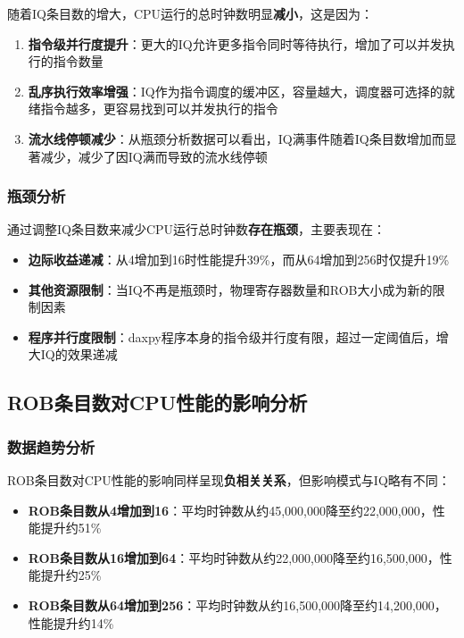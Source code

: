 \documentclass[a4paper]{article}
\begin{document}
随着IQ条目数的增大，CPU运行的总时钟数明显\textbf{减小}，这是因为：

\begin{enumerate}
    \item \textbf{指令级并行度提升}：更大的IQ允许更多指令同时等待执行，增加了可以并发执行的指令数量
    \item \textbf{乱序执行效率增强}：IQ作为指令调度的缓冲区，容量越大，调度器可选择的就绪指令越多，更容易找到可以并发执行的指令
    \item \textbf{流水线停顿减少}：从瓶颈分析数据可以看出，IQ满事件随着IQ条目数增加而显著减少，减少了因IQ满而导致的流水线停顿
\end{enumerate}

\subsubsection{瓶颈分析}

通过调整IQ条目数来减少CPU运行总时钟数\textbf{存在瓶颈}，主要表现在：

\begin{itemize}
    \item \textbf{边际收益递减}：从4增加到16时性能提升39\%，而从64增加到256时仅提升19\%
    \item \textbf{其他资源限制}：当IQ不再是瓶颈时，物理寄存器数量和ROB大小成为新的限制因素
    \item \textbf{程序并行度限制}：daxpy程序本身的指令级并行度有限，超过一定阈值后，增大IQ的效果递减
\end{itemize}

\subsection{ROB条目数对CPU性能的影响分析}

\subsubsection{数据趋势分析}

ROB条目数对CPU性能的影响同样呈现\textbf{负相关关系}，但影响模式与IQ略有不同：

\begin{itemize}
    \item \textbf{ROB条目数从4增加到16}：平均时钟数从约45,000,000降至约22,000,000，性能提升约51\%
    \item \textbf{ROB条目数从16增加到64}：平均时钟数从约22,000,000降至约16,500,000，性能提升约25\%
    \item \textbf{ROB条目数从64增加到256}：平均时钟数从约16,500,000降至约14,200,000，性能提升约14\%
\end{itemize}
\end{document}
